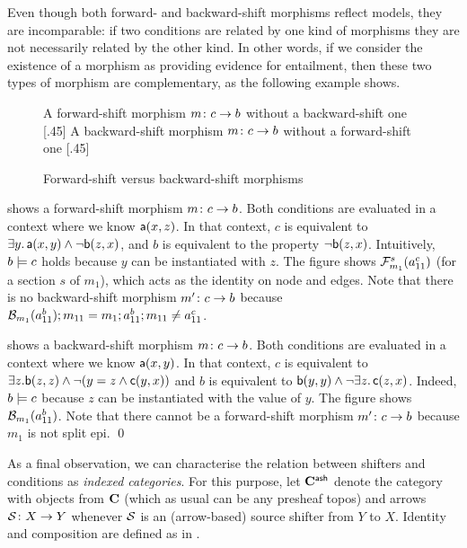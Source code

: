 \medskip\noindent
Even though both forward- and backward-shift morphisms reflect models, they are incomparable: if two conditions are related by one kind of morphisms they are not necessarily related by the other kind. In other words, if we consider the existence of a morphism as providing evidence for entailment, then these two types of morphism are complementary, as the following example shows.
%
\begin{figure}[t]
\centering
\subcaptionbox
  {A forward-shift morphism $m \colon c \rightarrow b$ without a backward-shift one
  }
  [.45\textwidth]
  {}
  \qquad
\subcaptionbox
  {A backward-shift morphism $m \colon c \rightarrow b$ without a forward-shift one
  }
  [.45\textwidth]
  {}
\caption{Forward-shift versus backward-shift morphisms}
\end{figure}
%
\begin{example}
 shows a forward-shift morphism $m \colon c \rightarrow b$. 
Both conditions are evaluated in a context where we know $\mathsf{a}(x,z)$. In that context,  $c$ is equivalent to $\exists y.\, \mathsf{a}(x,y) \wedge \neg \mathsf{b}(z,x)$, and $b$ is equivalent to the property $\neg \mathsf{b}(z,x)$. Intuitively, $b\models c$ holds because $y$ can be instantiated with $z$. The figure shows $\mathcal{F}_{m_1}^s(a^c_{11})$ (for a section $s$ of $m_1$), which acts as the identity on node and edges. Note that there is no backward-shift morphism $m'\colon c \rightarrow b$ because $\mathcal{B}_{m_1}(a^b_{11}) ; m_{11} = m_1; a^b_{11} ; m_{11} \not = a^c_{11}$.

 shows a backward-shift morphism $m \colon c \rightarrow b$. 
Both conditions are evaluated in a context where we know $\mathsf{a}(x,y)$. In that context, $c$ is equivalent to $\exists z.\mathsf{b}(z,z) \wedge \neg(y=z \wedge \mathsf{c}(y,x))$ and $b$ is equivalent to $\mathsf{b}(y,y) \wedge \neg \exists z.\, \mathsf{c}(z,x)$.
Indeed, $b\models c$ because $z$ can be instantiated with the value of $y$. The figure shows $\mathcal{B}_{m_1}(a^b_{11})$. Note that there cannot be a forward-shift morphism $m'\colon c \rightarrow b$ because $m_1$ is not split epi.
\qed
\end{example}
%
As a final observation, we can characterise the relation between shifters and conditions as \emph{indexed categories}. For this purpose, let $\mathbf{C}^{\mathsf{ash}}$ denote the category with objects from $\mathbf{C}$ (which as usual can be any presheaf topos) and arrows $\mathcal{S}\colon X\rightarrow Y$ whenever $\mathcal{S}$ is an (arrow-based) source shifter from $Y$ to $X$. Identity and composition are defined as in .

